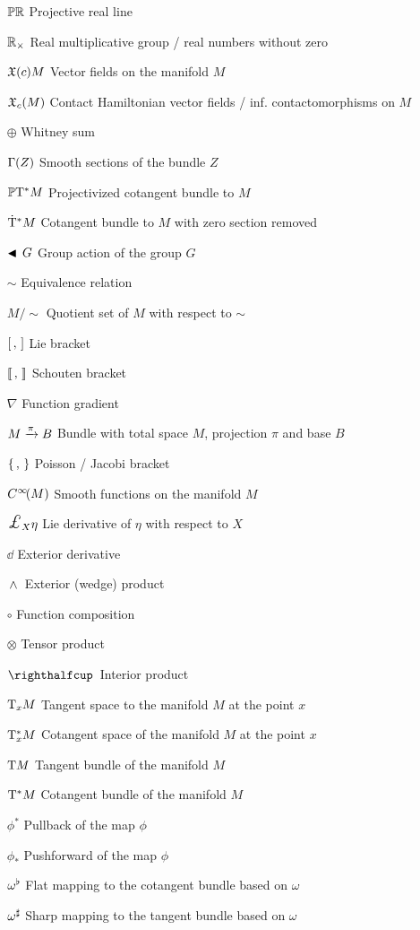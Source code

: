 \begin{itemize}[itemsep=0pt, leftmargin=3.4cm, labelsep=0cm, labelwidth=3.3cm, align=left]
%
    \item[$\mathbb{P}\mathbb{R}$] Projective real line
    \item[$\mathbb{R}_{\times}$] Real multiplicative group / real numbers without zero
%
%
    \item[$\mathfrak{X}\qty(c){M}$]  Vector fields on the manifold $M$
    \item[$\mathfrak{X}_{c}\qty(M)$]  Contact Hamiltonian vector fields / inf. contactomorphisms on $M$
    \item[$\oplus$]  Whitney sum
    \item[$\mathrm{\Gamma}\qty(Z)$]  Smooth sections of the bundle $Z$ 
    \item[$\mathbb{P}\mathrm{T}^* M$]  Projectivized cotangent bundle to $M$
    \item[$\mathrm{\dot{T}}^*M$]  Cotangent bundle to $M$ with zero section removed
    \item[$\blacktriangleleft\,G$]  Group action of the group $G$
    \item[$\sim$]  Equivalence relation
    \item[$M / \sim$]  Quotient set of $M$ with respect to $\sim$
    \item[$\qty[\,,\,]$]  Lie bracket
    \item[$\llbracket\,,\,\rrbracket$]  Schouten bracket
    \item[$\nabla$]  Function gradient
    \item[$M\xrightarrow[]{\pi}B$]  Bundle with total space $M$, projection $\pi$ and base $B$
    \item[$\qty{\,,\,}$]  Poisson / Jacobi bracket
    \item[$C^\infty\!\qty(M)$]  Smooth functions on the manifold $M$
    \item[$\lied{X}{\eta}$]  Lie derivative of $\eta$ with respect to $X$
    \item[$\dd{}$]  Exterior derivative
    \item[$ \,\wedge\, $]  Exterior (wedge) product
    \item[$\circ$]  Function composition
    \item[$\otimes$]  Tensor product
    \item[$\intpr{}{}$]  Interior product
    \item[$\mathrm{T}_{x} M$]  Tangent space to the manifold $M$ at the point $x$
    \item[$\mathrm{T}_{x}^*M$]  Cotangent space of the manifold $M$ at the point $x$
    \item[$\mathrm{T}M$]  Tangent bundle of the manifold $M$
    \item[$\mathrm{T}^*M$]  Cotangent bundle of the manifold $M$
    \item[$\phi^*$]  Pullback of the map $\phi$
    \item[$\phi_*$]  Pushforward of the map $\phi$
    \item[$\omega^\flat$]  Flat mapping to the cotangent bundle  based on $\omega$
    \item[$\omega^\sharp$]  Sharp mapping to the tangent bundle based on $\omega$
\end{itemize}